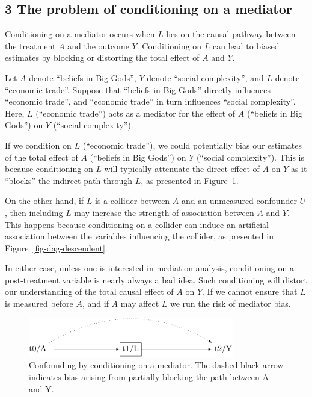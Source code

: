 \documentclass[
  singlecolumn]{report}
\begin{document}
\hypertarget{the-problem-of-conditioning-on-a-mediator}{%
\subsection{3 The problem of conditioning on a
mediator}\label{the-problem-of-conditioning-on-a-mediator}}

Conditioning on a mediator occurs when \(L\) lies on the causal pathway
between the treatment \(A\) and the outcome \(Y\). Conditioning on \(L\)
can lead to biased estimates by blocking or distorting the total effect
of \(A\) and \(Y\).

Let \(A\) denote ``beliefs in Big Gods'', \(Y\) denote ``social
complexity'', and \(L\) denote ``economic trade''. Suppose that
``beliefs in Big Gods'' directly influences ``economic trade'', and
``economic trade'' in turn influences ``social complexity''. Here, \(L\)
(``economic trade'') acts as a mediator for the effect of \(A\)
(``beliefs in Big Gods'') on \(Y\) (``social complexity'').

If we condition on \(L\) (``economic trade''), we could potentially bias
our estimates of the total effect of \(A\) (``beliefs in Big Gods'') on
\(Y\) (``social complexity''). This is because conditioning on \(L\)
will typically attenuate the direct effect of \(A\) on \(Y\) as it
``blocks'' the indirect path through \(L\), as presented in
Figure~\ref{fig-dag-mediator}.

On the other hand, if \(L\) is a collider between \(A\) and an
unmeasured confounder \(U\), then including \(L\) may increase the
strength of association between \(A\) and \(Y\). This happens because
conditioning on a collider can induce an artificial association between
the variables influencing the collider, as presented in
Figure~\ref{fig-dag-descendent}.

In either case, unless one is interested in mediation analysis,
conditioning on a post-treatment variable is nearly always a bad idea.
Such conditioning will distort our understanding of the total causal
effect of \(A\) on \(Y\). If we cannot ensure that \(L\) is measured
before \(A\), and if \(A\) may affect \(L\) we run the risk of mediator
bias.

\begin{figure}

{\centering \includegraphics[width=0.8\textwidth,height=\textheight]{causal-dags_files/figure-pdf/fig-dag-mediator-1.pdf}

}

\caption{\label{fig-dag-mediator}Confounding by conditioning on a
mediator. The dashed black arrow indicates bias arising from partially
blocking the path between A and Y.}

\end{figure}
\end{document}
